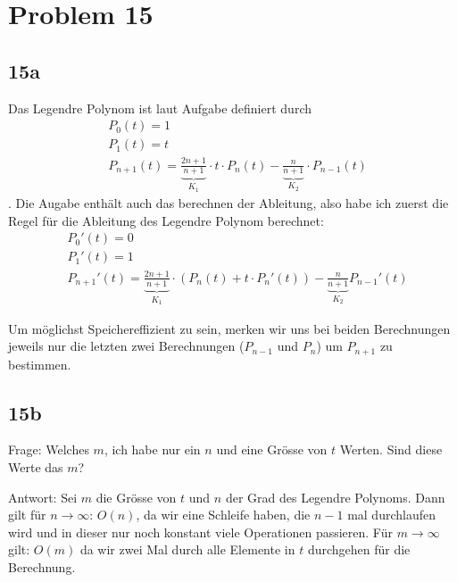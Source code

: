 \documentclass[11pt]{article}
\begin{document}
\section{Problem 15}
\subsection{15a}
Das Legendre Polynom ist laut Aufgabe definiert durch
\begin{align*}
&P_0(t) = 1\\
&P_1(t) = t\\
&P_{n+1}(t) = \underbrace{\frac{2n + 1}{n + 1}}_{K_1} \cdot t \cdot P_n(t) - \underbrace{\frac{n}{n+1}}_{K_2} \cdot P_{n-1}(t)
\end{align*}. Die Augabe enthält auch das berechnen der Ableitung, also habe ich zuerst die Regel für die Ableitung des Legendre Polynom berechnet:
\begin{align*}
&P_0'(t) = 0\\
&P_1'(t) = 1\\
&P_{n+1}'(t) = \underbrace{\frac{2n + 1}{n + 1}}_{K_1} \cdot ( P_n(t) + t \cdot P_n'(t)) - \underbrace{\frac{n}{n+1}}_{K_2} P_{n-1}'(t)
\end{align*}

Um möglichst Speichereffizient zu sein, merken wir uns bei beiden Berechnungen jeweils nur die letzten zwei Berechnungen ($P_{n-1}$ und $P_{n}$) um $P_{n+1}$ zu bestimmen.

\subsection{15b}
Frage: Welches $m$, ich habe nur ein $n$ und eine Grösse von $t$ Werten. Sind diese Werte das $m$?

Antwort: Sei $m$ die Grösse von $t$ und $n$ der Grad des Legendre Polynoms. Dann gilt für $n \to \infty$: $O(n)$, da wir eine Schleife haben, die $n-1$ mal durchlaufen wird und in dieser nur noch konstant viele Operationen passieren. Für $m \to \infty$ gilt: $O(m)$ da wir zwei Mal durch alle Elemente in $t$ durchgehen für die Berechnung.
\end{document}
